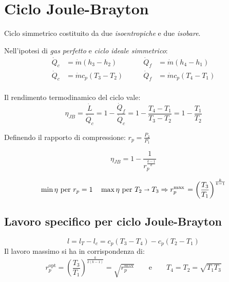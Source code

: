 \section{Ciclo Joule-Brayton}

Ciclo simmetrico costituito da due \emph{isoentropiche} e due \emph{isobare}.

\begin{minipage}{.5\linewidth}
\end{minipage}%
\begin{minipage}{.5\linewidth}
\end{minipage}

Nell'ipotesi di \emph{gas perfetto} e \emph{ciclo ideale simmetrico}:
\begin{align*}
    \dot{Q}_c &= \dot{m} (h_3-h_2) & \qquad \dot{Q}_f &= \dot{m} (h_4 - h_1) \\
    \dot{Q}_c &= \dot{m} c_p (T_3 - T_2) & \qquad \dot{Q}_f &= \dot{m} c_p (T_4 - T_1) \\
\end{align*}

Il rendimento termodinamico del ciclo vale:
\[
    \eta_{JB} = \frac{\dot{L}}{\dot{Q}_c} = 1 - \frac{\dot{Q}_f}{\dot{Q}_c} = 1 - \frac{T_4-T_1}{T_3-T_2} = 1 - \frac{T_1}{T_2}
\]

Definendo il rapporto di compressione: $r_p = \frac{P_2}{P_1}$

\[
    \eta_{JB} = 1 - \frac{1}{r_p^{\frac{k-1}{k}}}
\]

\begin{align*}
    \min \eta ~\text{per}~ r_p = 1 \quad \max \eta ~\text{per}~ T_2 \shortrightarrow T_3 \Rightarrow r_{p}^{\max{}} = \left(\frac{T_3}{T_1}\right)^\frac{k}{k-1}
\end{align*}

\subsection{Lavoro specifico per ciclo Joule-Brayton}
\[
    l = l_T - l_c = c_p (T_3 - T_4) - c_p (T_2 - T_1)
\]
Il lavoro massimo si ha in corrispondenza di:
\[
    r_p^{\text{opt}} = \left(\frac{T_3}{T_1}\right)^\frac{k}{2(k-1)} = \sqrt{r_p^{\max{}}} \qquad\text{e}\qquad T_4 = T_2 = \sqrt{T_1T_3}
\]
